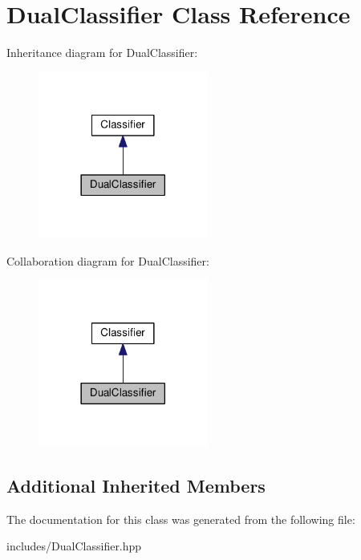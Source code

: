 \hypertarget{class_dual_classifier}{}\section{Dual\+Classifier Class Reference}
\label{class_dual_classifier}


Inheritance diagram for Dual\+Classifier\+:\nopagebreak
\begin{figure}[H]
\begin{center}
\leavevmode
\includegraphics[width=158pt]{class_dual_classifier__inherit__graph}
\end{center}
\end{figure}


Collaboration diagram for Dual\+Classifier\+:\nopagebreak
\begin{figure}[H]
\begin{center}
\leavevmode
\includegraphics[width=158pt]{class_dual_classifier__coll__graph}
\end{center}
\end{figure}
\subsection*{Additional Inherited Members}


The documentation for this class was generated from the following file\+:\begin{DoxyCompactItemize}
\item 
includes/Dual\+Classifier.\+hpp\end{DoxyCompactItemize}
